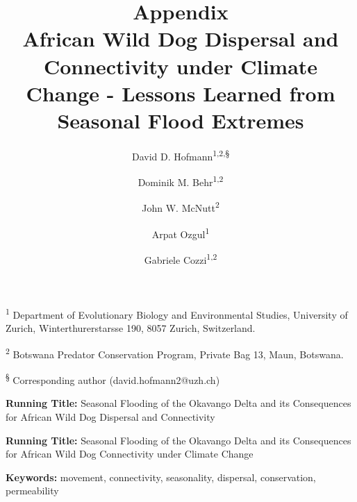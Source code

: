 \documentclass[abstract=on,10pt,a4paper,bibliography=totocnumbered]{article}
\title{\textbf{Appendix}\\ African Wild Dog Dispersal and Connectivity under
Climate Change - Lessons Learned from Seasonal Flood Extremes}
\author{
  David D. Hofmann\textsuperscript{1,2,\S} \orcid{0000-0003-3477-4365} \and
  Dominik M. Behr\textsuperscript{1,2} \orcid{0000-0001-7378-8538} \and
  John W. McNutt\textsuperscript{2} \and
  Arpat Ozgul\textsuperscript{1} \orcid{0000-0001-7477-2642} \and
  Gabriele Cozzi\textsuperscript{1,2} \orcid{0000-0002-1744-1940}
}
\newcommand{\beginappendix}{%
  \setcounter{table}{0}
  \renewcommand{\thetable}{S\arabic{table}}%
  \setcounter{figure}{0}
  \renewcommand{\thefigure}{S\arabic{figure}}%
  \setcounter{equation}{0}
  \renewcommand{\theequation}{Equation S\arabic{equation}}%
  \setcounter{section}{0}
  \renewcommand{\thesection}{A.\arabic{section}}%
}
\renewcommand{\theequation}{Equation \arabic{equation}}%
\begin{document}



\maketitle

\begin{flushleft}

\vspace{0.5cm}

\textsuperscript{1} Department of Evolutionary Biology and Environmental
Studies, University of Zurich, Winterthurerstarsse 190, 8057 Zurich,
Switzerland.

\textsuperscript{2} Botswana Predator Conservation Program, Private Bag 13,
Maun, Botswana.

\textsuperscript{\S} Corresponding author (david.hofmann2@uzh.ch)

\vspace{4cm}

\textbf{Running Title:} Seasonal Flooding of the Okavango Delta and its
Consequences for African Wild Dog Dispersal and Connectivity

\textbf{Running Title:} Seasonal Flooding of the Okavango Delta and its
Consequences for African Wild Dog Connectivity under Climate Change

\vspace{0.5cm}

\textbf{Keywords:} movement, connectivity, seasonality, dispersal, conservation,
permeability

\end{flushleft}

\newpage



\appendix
\beginappendix

\newpage
\end{document}
